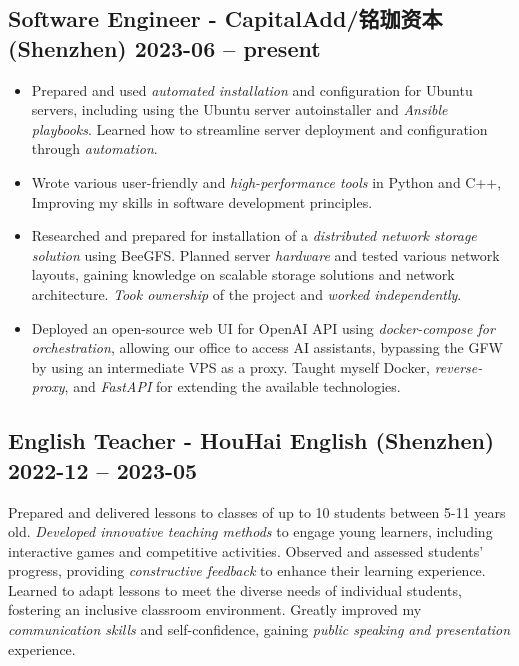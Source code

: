 \subsection{Software Engineer - CapitalAdd/铭珈资本 (Shenzhen) \hfill 2023-06 --
present}
\begin{itemize}
    \item Prepared and used \emph{automated installation} and configuration for
        Ubuntu servers, including using the Ubuntu server autoinstaller and
        \emph{Ansible playbooks}. Learned how to streamline server deployment
        and configuration through \emph{automation}.
    \item Wrote various user-friendly and \emph{high-performance tools} in
        Python and C++, Improving my skills in software development principles.
    \item Researched and prepared for installation of a \emph{distributed
        network storage solution} using BeeGFS. Planned server \emph{hardware}
        and tested various network layouts, gaining knowledge on scalable
        storage solutions and network architecture. \emph{Took ownership} of
        the project and \emph{worked independently}.
    \item Deployed an open-source web UI for OpenAI API using
        \emph{docker-compose for orchestration}, allowing our office to access
        AI assistants, bypassing the GFW by using an intermediate VPS as a
        proxy. Taught myself Docker, \emph{reverse-proxy}, and \emph{FastAPI}
        for extending the available technologies.
\end{itemize}

\subsection{English Teacher - HouHai English (Shenzhen) \hfill 2022-12 --
2023-05}
Prepared and delivered lessons to classes of up to 10 students between 5-11
years old. \emph{Developed innovative teaching methods} to engage young
learners, including interactive games and competitive activities. Observed and
assessed students' progress, providing \emph{constructive feedback} to enhance
their learning experience. Learned to adapt lessons to meet the diverse needs
of individual students, fostering an inclusive classroom environment. Greatly
improved my \emph{communication skills} and self-confidence, gaining
\emph{public speaking and presentation} experience.

